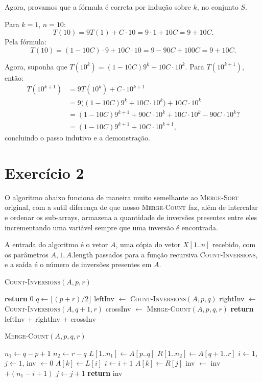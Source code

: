 \documentclass[a4paper]{article}
\begin{document}
Agora, provamos que a fórmula é correta por indução sobre $k$, no conjunto $S$.

Para $k=1$, $n=10$:
\[ T(10) = 9T(1) + C \cdot 10 = 9\cdot 1 + 10C = 9 + 10C. \]
Pela fórmula:
\[ T(10) = (1 - 10C) \cdot 9 + 10C \cdot 10 = 9 - 90C + 100C = 9 + 10C. \]

Agora, suponha que $T(10^k) = (1-10C) 9^k + 10C \cdot 10^k$.
Para $T(10^{k+1})$, então:
\begin{align*}
T(10^{k+1}) &= 9T(10^k) + C \cdot 10^{k+1} \\
&= 9 \big((1-10C) 9^k + 10C \cdot 10^k \big) + 10C \cdot 10^k \\
&= (1-10C) 9^{k+1} + 90C \cdot 10^k + 10C \cdot 10^k - 90C \cdot 10^k? \\
&= (1-10C) 9^{k+1} + 10C \cdot 10^{k+1},
\end{align*}
concluindo o passo indutivo e a demonstração.

\newpage

\section*{Exercício 2}

O algoritmo abaixo funciona de maneira muito semelhante ao \textsc{Merge-Sort} original, com a sutil diferença de que nosso \textsc{Merge-Count} faz, além de intercalar e ordenar os sub-arrays, armazena a quantidade de inversões presentes entre eles incrementando uma variável sempre que uma inversão é encontrada.

A entrada do algoritmo é o vetor $A$, uma cópia do vetor $X[1..n]$ recebido, com os parâmetros $A, 1, A$.length passados para a função recursiva \textsc{Count-Inversions}, e a saída é o número de inversões presentes em $A$.

\textsc{Count-Inversions}$(A, p, r)$
\begin{algorithmic}[1]
    \State \textbf{return} $0$
\EndIf
\State $q \gets \lfloor (p + r)/2 \rfloor$
\State leftInv $\gets$ \textsc{Count-Inversions}$(A, p, q)$
\State rightInv $\gets$ \textsc{Count-Inversions}$(A, q+1, r)$
\State crossInv $\gets$ \textsc{Merge-Count}$(A, p, q, r)$
\State \textbf{return} leftInv $+$ rightInv $+$ crossInv
\end{algorithmic}

\textsc{Merge-Count}$(A, p, q, r)$
\begin{algorithmic}[1]
\State $n_1 \gets q - p + 1$
\State $n_2 \gets r - q$
\State $L[1..n_1] \gets A[p..q]$
\State $R[1..n_2] \gets A[q+1..r]$
\State $i \gets 1$, $j \gets 1$, inv $\gets 0$
        \State $A[k] \gets L[i]$
        \State $i \gets i + 1$
    \Else
        \State $A[k] \gets R[j]$
        \State inv $\gets$ inv $+ (n_1 - i + 1)$
        \State $j \gets j + 1$
    \EndIf
\EndFor
\State \textbf{return} inv
\end{algorithmic}
\end{document}
